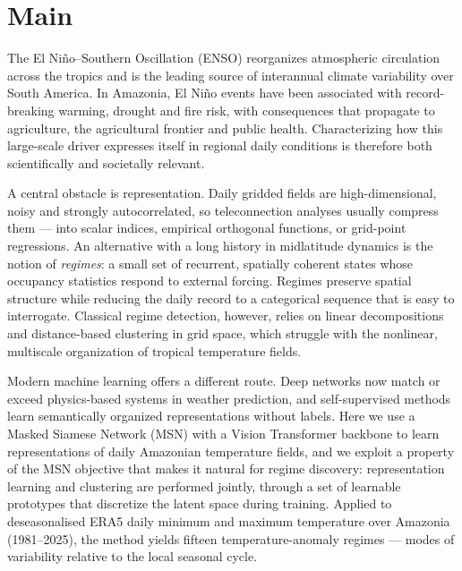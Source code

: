 \documentclass[pdflatex,sn-nature]{sn-jnl}
\begin{document}
\section{Main}\label{sec:main}

The El Ni\~no--Southern Oscillation (ENSO) reorganizes atmospheric circulation across the tropics and is the leading source of interannual climate variability over South America\cite{ropelewski1987global,cai2020enso}. In Amazonia, El Ni\~no events have been associated with record-breaking warming, drought and fire risk\cite{jimenez2016record,marengo2016amazon}, with consequences that propagate to agriculture\cite{Luiz_Silva_2024}, the agricultural frontier\cite{Marengo2022} and public health\cite{tian2025dengue}. Characterizing how this large-scale driver expresses itself in regional daily conditions is therefore both scientifically and societally relevant.

A central obstacle is representation. Daily gridded fields are high-dimensional, noisy and strongly autocorrelated, so teleconnection analyses usually compress them --- into scalar indices, empirical orthogonal functions, or grid-point regressions. An alternative with a long history in midlatitude dynamics is the notion of \emph{regimes}: a small set of recurrent, spatially coherent states whose occupancy statistics respond to external forcing\cite{michelangeli1995weather,hannachi2017regimes}. Regimes preserve spatial structure while reducing the daily record to a categorical sequence that is easy to interrogate. Classical regime detection, however, relies on linear decompositions and distance-based clustering in grid space, which struggle with the nonlinear, multiscale organization of tropical temperature fields.

Modern machine learning offers a different route. Deep networks now match or exceed physics-based systems in weather prediction\cite{GraphCast,Kochkov2024,bodnar2025aurora}, and self-supervised methods learn semantically organized representations without labels. Here we use a Masked Siamese Network (MSN)\cite{msn} with a Vision Transformer backbone\cite{vit_paper} to learn representations of daily Amazonian temperature fields, and we exploit a property of the MSN objective that makes it natural for regime discovery: representation learning and clustering are performed jointly, through a set of learnable prototypes\cite{caron2020swav} that discretize the latent space during training. Applied to deseasonalised ERA5\cite{hersbach2020era5} daily minimum and maximum temperature over Amazonia (1981--2025), the method yields fifteen temperature-anomaly regimes --- modes of variability relative to the local seasonal cycle.
\end{document}
